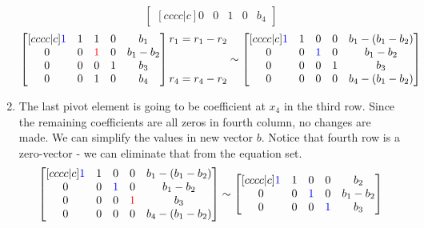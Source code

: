 \begin{enumerate}
\begin{equation}
\begin{bmatrix}[cccc|c]
    0 & 0 & 1 & 0 & b_4
\end{bmatrix}
\end{equation}
\begin{equation}
\begin{bmatrix}[cccc|c]
    \textcolor{blue}{1} & 1 & 1 & 0 & b_1 \\ 
    0 & 0 & \textcolor{red}{1} & 0 & b_1 - b_2 \\ 
    0 & 0 & 0 & 1 & b_3 \\ 
    0 & 0 & 1 & 0 & b_4
\end{bmatrix}
\begin{matrix} r_1 = r_1 - r_2\\ \\ \\ r_4 = r_4 - r_2\end{matrix} \sim
\begin{bmatrix}[cccc|c]
    \textcolor{blue}{1} & 1 & 0 & 0 & b_1 - (b_1 - b_2) \\ 
    0 & 0 & \textcolor{blue}{1} & 0 & b_1 - b_2 \\ 
    0 & 0 & 0 & 1 & b_3 \\ 
    0 & 0 & 0 & 0 & b_4 - (b_1 - b_2)
\end{bmatrix}
\end{equation}

\item The last pivot element is going to be coefficient at $x_4$ in the third row.
Since the remaining coefficients are all zeros in fourth column, no changes are made.
We can simplify the values in new vector $b$.
Notice that fourth row is a zero-vector - we can eliminate that from the equation set.
\begin{equation}
\begin{bmatrix}[cccc|c]
    \textcolor{blue}{1} & 1 & 0 & 0 & b_1 - (b_1 - b_2) \\ 
    0 & 0 & \textcolor{blue}{1} & 0 & b_1 - b_2 \\ 
    0 & 0 & 0 & \textcolor{red}{1} & b_3 \\ 
    0 & 0 & 0 & 0 & b_4 - (b_1 - b_2)
\end{bmatrix}
\sim
\begin{bmatrix}[cccc|c]
    \textcolor{blue}{1} & 1 & 0 & 0 & b_2 \\ 
    0 & 0 & \textcolor{blue}{1} & 0 & b_1 - b_2 \\ 
    0 & 0 & 0 & \textcolor{blue}{1} & b_3 \\ 
\end{bmatrix}
\end{equation}
\end{enumerate}

